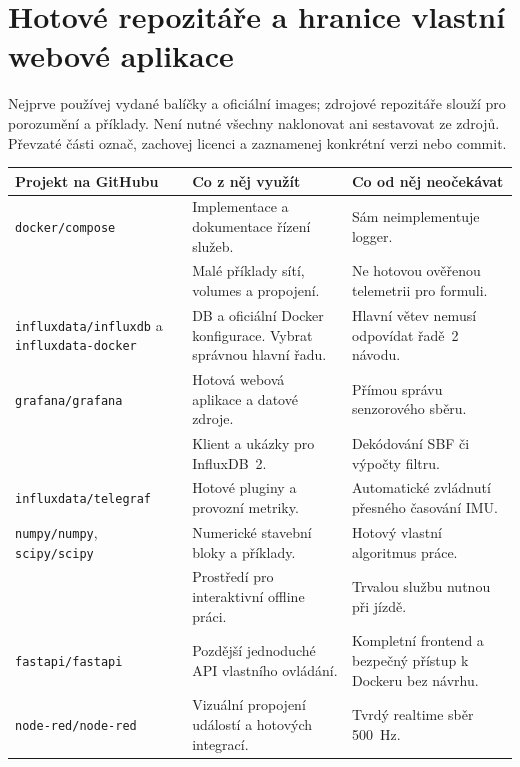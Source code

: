 \documentclass[11pt,a4paper]{article}
\begin{document}
\clearpage
\section{Hotové repozitáře a hranice vlastní webové aplikace}
Nejprve používej vydané balíčky a oficiální images; zdrojové repozitáře slouží pro porozumění a příklady. Není nutné všechny naklonovat ani sestavovat ze zdrojů. Převzaté části označ, zachovej licenci a zaznamenej konkrétní verzi nebo commit.

\small
\begin{longtable}{@{}L{44mm}L{58mm}L{48mm}@{}}
\toprule Projekt na GitHubu & Co z něj využít & Co od něj neočekávat\\\midrule\endhead
\texttt{docker/compose}\cite{repo-compose} & Implementace a dokumentace řízení služeb. & Sám neimplementuje logger.\\\addlinespace
{}\cite{awesome} & Malé příklady sítí, volumes a propojení. & Ne hotovou ověřenou telemetrii pro formuli.\\\addlinespace
\texttt{influxdata/influxdb}\cite{repo-influx} a \texttt{influxdata-docker}\cite{dockerfiles} & DB a oficiální Docker konfigurace. Vybrat správnou hlavní řadu. & Hlavní větev nemusí odpovídat řadě~2 návodu.\\\addlinespace
\texttt{grafana/grafana}\cite{repo-grafana} & Hotová webová aplikace a datové zdroje. & Přímou správu senzorového sběru.\\\addlinespace
{}\cite{python-client} & Klient a ukázky pro InfluxDB~2. & Dekódování SBF či výpočty filtru.\\\addlinespace
\texttt{influxdata/telegraf}\cite{telegraf} & Hotové pluginy a provozní metriky. & Automatické zvládnutí přesného časování IMU.\\\addlinespace
\texttt{numpy/numpy}, \texttt{scipy/scipy}\cite{repo-numpy,repo-scipy} & Numerické stavební bloky a příklady. & Hotový vlastní algoritmus práce.\\\addlinespace
{}\cite{repo-jupyter} & Prostředí pro interaktivní offline práci. & Trvalou službu nutnou při jízdě.\\\addlinespace
\texttt{fastapi/fastapi}\cite{fastapi} & Pozdější jednoduché API vlastního ovládání. & Kompletní frontend a bezpečný přístup k Dockeru bez návrhu.\\\addlinespace
\texttt{node-red/node-red}\cite{nodered} & Vizuální propojení událostí a hotových integrací. & Tvrdý realtime sběr 500~Hz.\\
\bottomrule\end{longtable}
\normalsize
\end{document}
